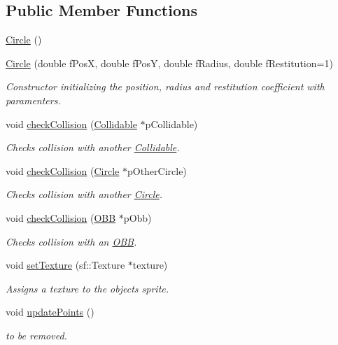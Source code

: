 \subsection*{Public Member Functions}
\begin{DoxyCompactItemize}
\item 
\hyperlink{class_circle_ad1ecfcfc7bf34529c6a6d6c448bf70fe}{Circle} ()
\item 
\hyperlink{class_circle_a70b2953314268546bc4f784c3e82df1b}{Circle} (double f\+Pos\+X, double f\+Pos\+Y, double f\+Radius, double f\+Restitution=1)
\begin{DoxyCompactList}\small\item\em Constructor initializing the position, radius and restitution coefficient with paramenters. \end{DoxyCompactList}\item 
void \hyperlink{class_circle_ad74b27696652e85e97503aef986f32b5}{check\+Collision} (\hyperlink{class_collidable}{Collidable} $\ast$p\+Collidable)
\begin{DoxyCompactList}\small\item\em Checks collision with another \hyperlink{class_collidable}{Collidable}. \end{DoxyCompactList}\item 
void \hyperlink{class_circle_a7c54825cfff10ec9d6edb718431cd475}{check\+Collision} (\hyperlink{class_circle}{Circle} $\ast$p\+Other\+Circle)
\begin{DoxyCompactList}\small\item\em Checks collision with another \hyperlink{class_circle}{Circle}. \end{DoxyCompactList}\item 
void \hyperlink{class_circle_ad033972b43e0e590a4c4e7ec45a392e1}{check\+Collision} (\hyperlink{class_o_b_b}{O\+B\+B} $\ast$p\+Obb)
\begin{DoxyCompactList}\small\item\em Checks collision with an \hyperlink{class_o_b_b}{O\+B\+B}. \end{DoxyCompactList}\item 
void \hyperlink{class_circle_ac6c48964ac829b4c1a15b313d9ae102a}{set\+Texture} (sf\+::\+Texture $\ast$texture)
\begin{DoxyCompactList}\small\item\em Assigns a texture to the object\textquotesingle{}s sprite. \end{DoxyCompactList}\item 
\hypertarget{class_circle_afe23c30a1bbc5e831b72063aef91b38f}{}void \hyperlink{class_circle_afe23c30a1bbc5e831b72063aef91b38f}{update\+Points} ()\label{class_circle_afe23c30a1bbc5e831b72063aef91b38f}

\begin{DoxyCompactList}\small\item\em to be removed. \end{DoxyCompactList}\end{DoxyCompactItemize}
